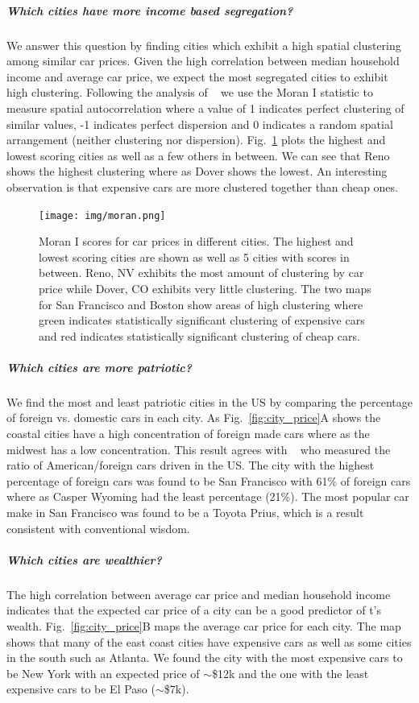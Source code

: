 \documentclass[10pt,twocolumn,letterpaper]{article}
\begin{document}
\subparagraph{Which cities have more income based segregation?}
We answer this question by finding cities which exhibit a high spatial clustering among similar car prices. Given the high correlation between median household income and average car price, we expect the most segregated cities to exhibit high clustering. Following the analysis of ~\cite{mit_plos_1} we use the Moran I statistic to measure spatial autocorrelation where a value of 1 indicates perfect clustering of similar values, -1 indicates perfect dispersion and 0 indicates a random spatial arrangement (neither clustering nor dispersion). Fig.~\ref{fig:moran-i} plots the highest and lowest scoring cities as well as a few others in between. We can see that Reno shows the highest clustering where as Dover shows the lowest. An interesting observation is that expensive cars are more clustered together than cheap ones. 

\begin{figure}[t]
\begin{center}
    \texttt{[image: img/moran.png]}
\end{center}
   \caption {Moran I scores for car prices in different cities. The highest and lowest scoring cities are shown as well as 5 cities with scores in between. Reno, NV exhibits the most amount of clustering by car price while Dover, CO exhibits very little clustering. The two maps for San Francisco and Boston show areas of high clustering where green indicates statistically significant clustering of expensive cars and red indicates statistically significant clustering of cheap cars.} 
\label{fig:moran-i}
\end{figure}

\subparagraph{Which cities are more patriotic?}
We find the most and least patriotic cities in the US by comparing the percentage of foreign vs. domestic cars in each city. As Fig.~\ref{fig:city_price}A shows the coastal cities have a high concentration of foreign made cars where as the midwest has a low concentration. This result agrees with ~\cite{foreign_domestic} who measured the ratio of American/foreign cars driven in the US. The city with the highest percentage of foreign cars was found to be San Francisco with 61\% of foreign cars where as Casper Wyoming had the least percentage (21\%). The most popular car make in San Francisco was found to be a Toyota Prius, which is a result consistent with conventional wisdom.

\subparagraph{Which cities are wealthier?}
The high correlation between average car price and median household income indicates that the expected car price of a city can be a good predictor of t's wealth. Fig.~\ref{fig:city_price}B maps the average car price for each city. The map shows that many of the east coast cities have expensive cars as well as some cities in the south such as Atlanta. We found the city with the most expensive cars to be New York with an expected price of \(\sim\)\$12k and the one with the least expensive cars to be El Paso (\(\sim\)\$7k). 
\end{document}
